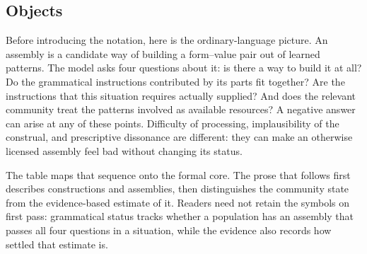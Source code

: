 \subsection{Objects}
\label{sec:objects}

Before introducing the notation, here is the ordinary-language picture. An
assembly is a candidate way of building a form--value pair out of learned
patterns. The model asks four questions about it: is there a way to build it at
all? Do the grammatical instructions contributed by its parts fit together? Are
the instructions that this situation requires actually supplied? And does the
relevant community treat the patterns involved as available resources? A
negative answer can arise at any of these points. Difficulty of processing,
implausibility of the construal, and prescriptive dissonance are different: they
can make an otherwise licensed assembly feel bad without changing its status.

The table maps that sequence onto the formal core. The prose that follows first
describes constructions and assemblies, then distinguishes the community state
from the evidence-based estimate of it. Readers need not retain the symbols on
first pass: grammatical status tracks whether a population has an assembly that
passes all four questions in a situation, while the evidence also records how
settled that estimate is.

